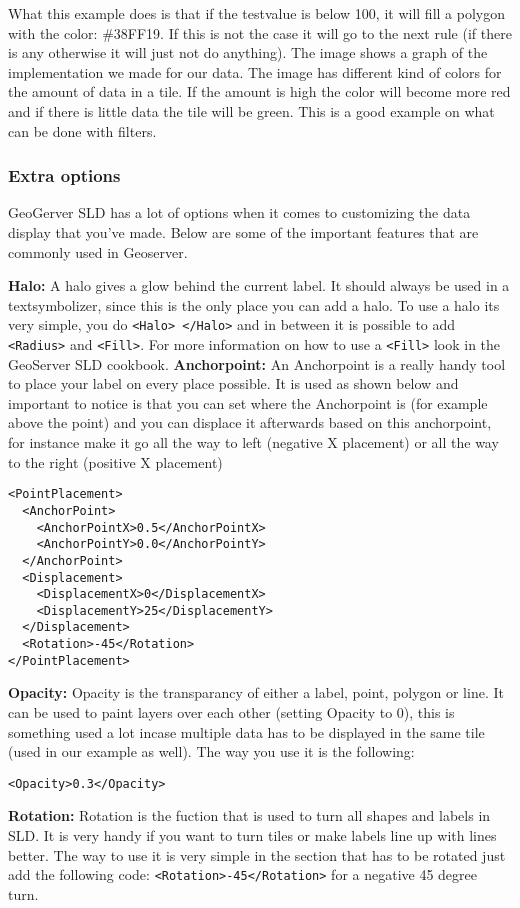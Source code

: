 What this example does is that if the testvalue is below 100, it will fill a polygon with the color: \#38FF19. If this is not the case it will go to the next rule (if there is any otherwise it will just not do anything). The image shows a graph of the implementation we made for our data. The image has different kind of colors for the amount of data in a tile. If the amount is high the color will become more red and if there is little data the tile will be green. This is a good example on what can be done with filters.

\subsubsection{Extra options}

GeoGerver SLD has a lot of options when it comes to customizing the data display that you've made. Below are some of the important features that are commonly used in Geoserver.

\textbf{Halo:} A halo gives a glow behind the current label. It should always be used in a textsymbolizer, since this is the only place you can add a halo. To use a halo its very simple, you do \lstinline|<Halo> </Halo>| and in between it is possible to add \lstinline|<Radius>| and \lstinline|<Fill>|. For more information on how to use a \lstinline|<Fill>| look in the GeoServer SLD cookbook.
\newline
\textbf{Anchorpoint:} An Anchorpoint is a really handy tool to place your label on every place possible. It is used as shown below and important to notice is that you can set where the Anchorpoint is (for example above the point) and you can displace it afterwards based on this anchorpoint, for instance make it go all the way to left (negative X placement) or all the way to the right (positive X placement)
\begin{lstlisting}
<PointPlacement>
  <AnchorPoint>
    <AnchorPointX>0.5</AnchorPointX>
    <AnchorPointY>0.0</AnchorPointY>
  </AnchorPoint>
  <Displacement>
    <DisplacementX>0</DisplacementX>
    <DisplacementY>25</DisplacementY>
  </Displacement>
  <Rotation>-45</Rotation>
</PointPlacement>
\end{lstlisting}
\textbf{Opacity:} Opacity is the transparancy of either a label, point, polygon or line. It can be used to paint layers over each other (setting Opacity to 0), this is something used a lot incase multiple data has to be displayed in the same tile (used in our example as well). The way you use it is the following:
\begin{lstlisting}
<Opacity>0.3</Opacity>
\end{lstlisting}
\textbf{Rotation:} Rotation is the fuction that is used to turn all shapes and labels in SLD. It is very handy if you want to turn tiles or make labels line up with lines better. The way to use it is very simple in the section that has to be rotated just add the following code: \lstinline|<Rotation>-45</Rotation>| for a negative 45 degree turn.

